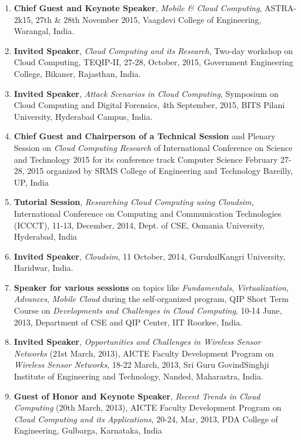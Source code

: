 \begin{enumerate}
\item
\textbf{Chief Guest and Keynote Speaker}, \textit{Mobile \& Cloud Computing}, ASTRA-2k15, 27th \& 28th November 2015, Vaagdevi College of Engineering, Warangal, India.

\item
\textbf{Invited Speaker}, \textit{Cloud Computing and its Research}, Two-day workshop on Cloud Computing, TEQIP-II, 27-28, October, 2015, Government Engineering College, Bikaner, Rajasthan, India.

\item
\textbf{Invited Speaker}, \textit{Attack Scenarios in Cloud Computing}, Symposium on Cloud Computing and Digital Forensics, 4th September, 2015, BITS Pilani University, Hyderabad Campus, India.

\item
\textbf{Chief Guest and Chairperson of a Technical Session} and Plenary Session on \textit{Cloud Computing Research} of International Conference on Science and Technology 2015 for its conference track Computer Science February 27-28, 2015 organized by SRMS College of Engineering and Technology Bareilly, UP, India

\item
\textbf{Tutorial Session}, \textit{Researching Cloud Computing using Cloudsim}, International Conference on Computing and Communication Technologies (ICCCT), 11-13, December, 2014, Dept. of CSE, Osmania University, Hyderabad, India

\item
\textbf{Invited Speaker}, \textit{Cloudsim}, 11 October, 2014, GurukulKangri University, Haridwar, India.

\item
\textbf{Speaker for various sessions} on topics like \textit{Fundamentals}, \textit{Virtualization}, \textit{Advances}, \textit{Mobile Cloud} during the self-organized program, QIP Short Term Course on \textit{Developments and Challenges in Cloud Computing}, 10-14 June, 2013, Department of CSE and QIP Center, IIT Roorkee, India.

\item
\textbf{Invited Speaker}, \textit{Opportunities and Challenges in Wireless Sensor Networks} (21st March, 2013), AICTE Faculty Development Program on \textit{Wireless Sensor Networks}, 18-22 March, 2013, Sri Guru GovindSinghji Institute of Engineering and Technology, Nanded, Maharastra, India.

\item
\textbf{Guest of Honor and Keynote Speaker}, \textit{Recent Trends in Cloud Computing} (20th March, 2013), AICTE Faculty Development Program on \textit{Cloud Computing and its Applications}, 20-24, Mar, 2013, PDA College of Engineering, Gulbarga, Karnataka, India


\end{enumerate}
